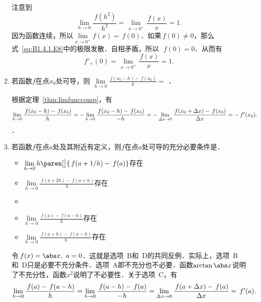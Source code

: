 \begin{enumerate}
  \ifshowsol
    注意到
    \begin{equation}
      \lim_{h\to0} \frac{\,f(h^2)}{h^2} = \!\lim_{\,x\to0^+\!} \!\frac{\,f(x)}{x} = 1.
      \label{eq:B1.4.1.E8}
    \end{equation}
    因为函数连续，所以\(\!\lim\limits_{x\to0^+} f(x) = \,f(0)\)．如果\(\,f(0) \ne 0\)，那么式~\eqref{eq:B1.4.1.E8}中的极限发散．自相矛盾，所以~\(\,f(0) = 0\)．从而有
    \begin{equation*}
      f'_+(0)
      = \!\lim_{\,x\to0^+\!} \!\frac{\,f(x)}{x} = 1.
    \end{equation*}
  \fi

\item 若函数\(f\)在点\(x_0\)处可导，则
  \begin{math}
    \lim\limits_{h\to0} \frac{\,f(x_0-h) - \,f(x_0)}{h} =
  \end{math}
  \ifshowsol
    {\setlength{\ULdepth}{.9ex}%
      \uline{}}．

    根据定理~\ref{thm:limfunccomp}，有
    \begin{equation*}
      \lim_{h\to0} \frac{\,f(x_0-h) - \,f(x_0)}{h}
      = - \lim_{h\to0} \frac{\,f(x_0-h) - \,f(x_0)}{-h}
      = - \lim_{\mathop{}\!\Delta x\to0} \frac{\,f(x_0+\mathop{}\!\Delta x) - \,f(x_0)}{\mathop{}\!\Delta x}
      = - \,f'(x_0).
    \end{equation*}
  \else
    \uline{\hspace{6em}}．
  \fi

\item 若函数\(f\)在点\(a\)处及其附近有定义，则\(f\)在点\(a\)处可导的充分必要条件是\uline{\hfill}．
  \begin{itemize}
    \renewcommand{\labelitemi}{\faCircleThin}
  \item \(\lim\limits_{h\to0} h\paren[\big]{\,f(a+1/h) - \,f(a)}\)存在
  \item \(\lim\limits_{h\to0} \frac{\,f(a+2h) - \,f(a+h)}{h}\)存在
    \ifshowsol
    \item[\faCircle]
    \else
    \item
    \fi
    \(\lim\limits_{h\to0} \frac{\,f(a) - \,f(a-h)}{h}\)存在
  \item \(\lim\limits_{h\to0} \frac{\,f(a+h) - \,f(a-h)}{h}\)存在
  \end{itemize}

  \ifshowsol
    令\(\,f(x) = \abs x,\ a = 0\)．这就是选项~B和~D的共同反例．实际上，选项~B和~D只是必要不充分条件．选项~A即不充分也不必要．函数\(\arctan\abs x\)说明了不充分性，函数\(x^2\)说明了不必要性．关于选项~C，有
    \begin{equation*}
      \lim_{h\to0} \frac{\,f(a) - \,f(a-h)}{h}
      = \lim_{h\to0} \frac{\,f(a-h) - \,f(a)}{-h}
      = \lim_{\mathop{}\!\Delta x\to0} \frac{\,f(a+\mathop{}\!\Delta x) - \,f(a)}{\mathop{}\!\Delta x}
      = \,f'(a).
    \end{equation*}
  \fi


\end{enumerate}
